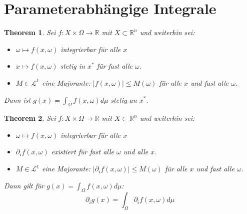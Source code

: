 \documentclass[10pt,a4paper]{article}
\newtheorem{theorem}{Theorem}
\begin{document}
\section{Parameterabhängige Integrale}
\begin{theorem}
	Sei $f: X \times \Omega \to \mathbb{R}$ mit $X \subset \mathbb{R}^n$ und weiterhin sei:
	\begin{itemize}
		\item $\omega \mapsto f(x, \omega)$ integrierbar für alle $x$
		\item $x\mapsto f(x, \omega)$ stetig in $x^*$ für fast alle $\omega$.
		\item $M\in \mathcal{L}^1$ eine Majorante: $|f(x, \omega)| \leq M(\omega)$ für alle $x$ und fast alle $\omega$.
	\end{itemize}
	Dann ist $g(x) = \int_\Omega f(x, \omega) d\mu$ stetig an $x^*$.
\end{theorem}
\begin{theorem}
	Sei $f: X \times \Omega \to \mathbb{R}$ mit $X \subset \mathbb{R}^n$ und weiterhin sei:
	\begin{itemize}
		\item $\omega \mapsto f(x, \omega)$ integrierbar für alle $x$
		\item $\partial_if(x, \omega)$ existiert für fast alle $\omega$ und alle $x$.
		\item $M\in \mathcal{L}^1$ eine Majorante: $|\partial_if(x, \omega)| \leq M(\omega)$ für alle $x$ und fast alle $\omega$.
	\end{itemize}
	Dann gilt für $g(x) = \int_\Omega f(x, \omega) d\mu$:
	$$\partial_ig(x) = \int_\Omega\partial_if(x, \omega) d\mu$$
\end{theorem}
\end{document}
